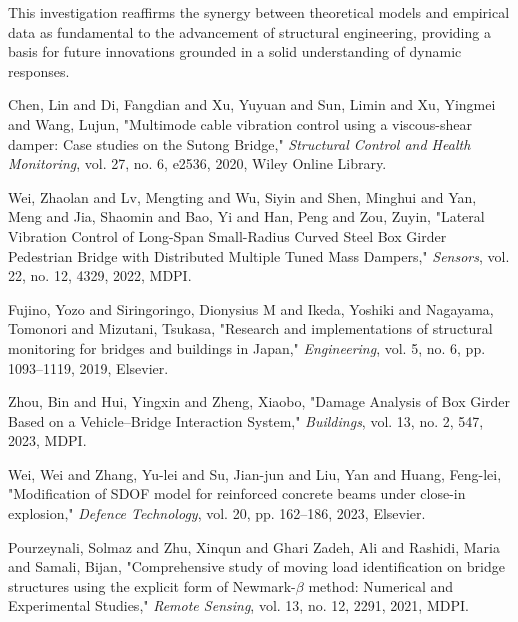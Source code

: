 \documentclass[conference]{IEEEtran}
\begin{document}
This investigation reaffirms the synergy between theoretical models and empirical data as fundamental to the advancement of structural engineering, providing a basis for future innovations grounded in a solid understanding of dynamic responses.

\begin{thebibliography}{100}
Chen, Lin and Di, Fangdian and Xu, Yuyuan and Sun, Limin and Xu, Yingmei and Wang, Lujun,
"Multimode cable vibration control using a viscous-shear damper: Case studies on the Sutong Bridge," 
\textit{Structural Control and Health Monitoring}, vol. 27, no. 6, e2536, 2020, Wiley Online Library.

Wei, Zhaolan and Lv, Mengting and Wu, Siyin and Shen, Minghui and Yan, Meng and Jia, Shaomin and Bao, Yi and Han, Peng and Zou, Zuyin,
"Lateral Vibration Control of Long-Span Small-Radius Curved Steel Box Girder Pedestrian Bridge with Distributed Multiple Tuned Mass Dampers," 
\textit{Sensors}, vol. 22, no. 12, 4329, 2022, MDPI.

Fujino, Yozo and Siringoringo, Dionysius M and Ikeda, Yoshiki and Nagayama, Tomonori and Mizutani, Tsukasa,
"Research and implementations of structural monitoring for bridges and buildings in Japan," 
\textit{Engineering}, vol. 5, no. 6, pp. 1093--1119, 2019, Elsevier.

Zhou, Bin and Hui, Yingxin and Zheng, Xiaobo,
"Damage Analysis of Box Girder Based on a Vehicle--Bridge Interaction System," 
\textit{Buildings}, vol. 13, no. 2, 547, 2023, MDPI.

Wei, Wei and Zhang, Yu-lei and Su, Jian-jun and Liu, Yan and Huang, Feng-lei,
"Modification of SDOF model for reinforced concrete beams under close-in explosion," 
\textit{Defence Technology}, vol. 20, pp. 162--186, 2023, Elsevier.

Pourzeynali, Solmaz and Zhu, Xinqun and Ghari Zadeh, Ali and Rashidi, Maria and Samali, Bijan,
"Comprehensive study of moving load identification on bridge structures using the explicit form of Newmark-$\beta$ method: Numerical and Experimental Studies," 
\textit{Remote Sensing}, vol. 13, no. 12, 2291, 2021, MDPI.



\end{thebibliography}
\end{document}

